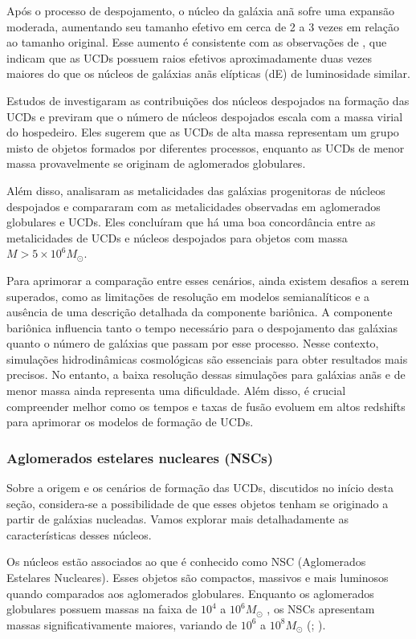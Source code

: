Após o processo de despojamento, o núcleo da galáxia anã sofre uma expansão moderada, aumentando seu tamanho efetivo em cerca de 2 a 3 vezes em relação ao tamanho original. Esse aumento é consistente com as observações de \cite{Evstigneeva_2008}, que indicam que as UCDs possuem raios efetivos aproximadamente duas vezes maiores do que os núcleos de galáxias anãs elípticas (dE) de luminosidade similar.

Estudos de \cite{Pfeffer_2016} investigaram as contribuições dos núcleos despojados na formação das UCDs e previram que o número de núcleos despojados escala com a massa virial do hospedeiro. Eles sugerem que as UCDs de alta massa representam um grupo misto de objetos formados por diferentes processos, enquanto as UCDs de menor massa provavelmente se originam de aglomerados globulares.

Além disso, \cite{Pfeffer_2016} analisaram as metalicidades das galáxias progenitoras de núcleos despojados e compararam com as metalicidades observadas em aglomerados globulares e UCDs. Eles concluíram que há uma boa concordância entre as metalicidades de UCDs e núcleos despojados para objetos com massa $M > 5 \times 10^6 M_{\odot}$.

Para aprimorar a comparação entre esses cenários, ainda existem desafios a serem superados, como as limitações de resolução em modelos semianalíticos e a ausência de uma descrição detalhada da componente bariônica. A componente bariônica influencia tanto o tempo necessário para o despojamento das galáxias quanto o número de galáxias que passam por esse processo. Nesse contexto, simulações hidrodinâmicas cosmológicas são essenciais para obter resultados mais precisos. No entanto, a baixa resolução dessas simulações para galáxias anãs e de menor massa ainda representa uma dificuldade. Além disso, é crucial compreender melhor como os tempos e taxas de fusão evoluem em altos redshifts para aprimorar os modelos de formação de UCDs.

\subsubsection{Aglomerados estelares nucleares (NSCs)}\label{subsubsection:NSC}
Sobre a origem e os cenários de formação das UCDs, discutidos no início desta seção, considera-se a possibilidade de que esses objetos tenham se originado a partir de galáxias nucleadas. Vamos explorar mais detalhadamente as características desses núcleos.

Os núcleos estão associados ao que é conhecido como \ac{NSC} (Aglomerados Estelares Nucleares). Esses objetos são compactos, massivos e mais luminosos quando comparados aos aglomerados globulares. Enquanto os aglomerados globulares possuem massas na faixa de $10^4$ a $10^6 M_{\odot}$ \citep{Masters_2010}, os NSCs apresentam massas significativamente maiores, variando de $10^6$ a $10^8 M_{\odot}$ (\citealp{Spengler_2017}; \citealp{Georgiev_2016}).

